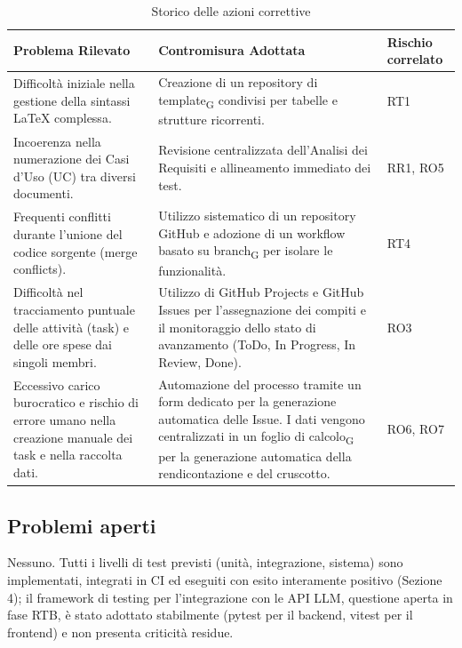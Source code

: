 \begin{table}[H]
    \centering
    \renewcommand{\arraystretch}{1.3}
    \begin{tabularx}{\textwidth}{|p{6cm}|p{6.5cm}|X|}
        \hline
        \rowcolor{primarycolor!10}
        \textbf{Problema Rilevato} & \textbf{Contromisura Adottata} & \textbf{Rischio correlato} \\
        \hline
        Difficoltà iniziale nella gestione della sintassi LaTeX complessa. & Creazione di un repository di template\textsubscript{G} condivisi per tabelle e strutture ricorrenti. & RT1 \\
        \hline
        Incoerenza nella numerazione dei Casi d'Uso (UC) tra diversi documenti. & Revisione centralizzata dell'Analisi dei Requisiti e allineamento immediato dei test. & RR1, RO5 \\
        \hline
        Frequenti conflitti durante l'unione del codice sorgente (merge conflicts). & Utilizzo sistematico di un repository GitHub e adozione di un workflow basato su branch\textsubscript{G} per isolare le funzionalità. & RT4 \\
        \hline
        Difficoltà nel tracciamento puntuale delle attività (task) e delle ore spese dai singoli membri. & Utilizzo di GitHub Projects e GitHub Issues per l'assegnazione dei compiti e il monitoraggio dello stato di avanzamento (ToDo, In Progress, In Review, Done). & RO3 \\
        \hline
        Eccessivo carico burocratico e rischio di errore umano nella creazione manuale dei task e nella raccolta dati. & Automazione del processo tramite un form dedicato per la generazione automatica delle Issue. I dati vengono centralizzati in un foglio di calcolo\textsubscript{G} per la generazione automatica della rendicontazione e del cruscotto. & RO6, RO7 \\
        \hline
    \end{tabularx}
    \caption{Storico delle azioni correttive}
\end{table}

\subsection{Problemi aperti}
Nessuno. Tutti i livelli di test previsti (unità, integrazione, sistema) sono implementati, integrati in CI ed eseguiti con esito interamente positivo (Sezione 4); il framework di testing per l'integrazione con le API LLM, questione aperta in fase RTB, è stato adottato stabilmente (pytest per il backend, vitest per il frontend) e non presenta criticità residue.

